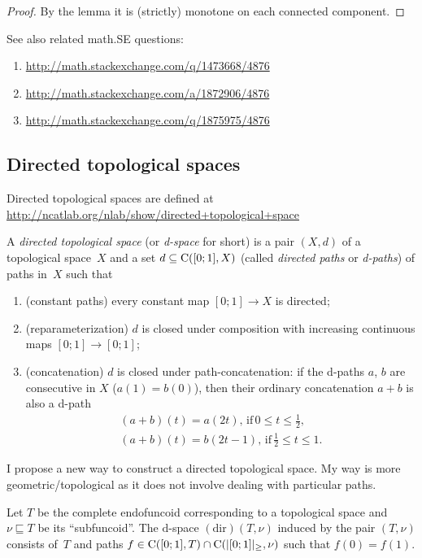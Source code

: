 \begin{proof}
By the lemma it is (strictly) monotone on each connected component.
\end{proof}

See also related math.SE questions:
\begin{enumerate}
\item \url{http://math.stackexchange.com/q/1473668/4876}
\item \url{http://math.stackexchange.com/a/1872906/4876}
\item \url{http://math.stackexchange.com/q/1875975/4876}
\end{enumerate}

\subsection{Directed topological spaces}

Directed topological spaces are defined at\\
\url{http://ncatlab.org/nlab/show/directed+topological+space}

\begin{defn}
A \emph{directed topological space} (or \emph{d-space} for short) is a pair $(X,d)$ of a topological space~$X$ and
a set $d\subseteq\mathrm{C}([0;1],X)$ (called \emph{directed paths} or \emph{d-paths}) of paths in~$X$ such that
\begin{enumerate}
\item (constant paths) every constant map $[0;1]\to X$ is directed;
\item (reparameterization) $d$ is closed under composition with increasing continuous maps $[0;1]\to [0;1]$;
\item (concatenation) $d$ is closed under path-concatenation: if the d-paths $a$, $b$ are consecutive in $X$ ($a(1)=b(0)$), then their ordinary concatenation $a+b$ is also a d-path
\begin{gather*}
(a+b)(t) = a(2t),\,\text{if}\, 0\le t\le \frac{1}{2}, \\
(a+b)(t) = b(2t-1),\,\text{if}\, \frac{1}{2}\le t\le 1.
\end{gather*}
\end{enumerate}
\end{defn}

I propose a new way to construct a directed topological space. My way is more geometric/topological as it does not involve dealing with particular paths.

\begin{defn}
Let $ T$ be the complete endofuncoid corresponding to a topological space
and $\nu\sqsubseteq T$ be its ``subfuncoid''. The $\mathrm{d}$-space $\operatorname{(dir)}(T,\nu)$ induced by the pair $(T,\nu)$
consists of~$ T$ and paths $f\in\mathrm{C}([0;1], T) \cap \mathrm{C}(|[0;1]|_{\geq}, \nu)$
such that $f(0)=f(1)$.
\end{defn}

